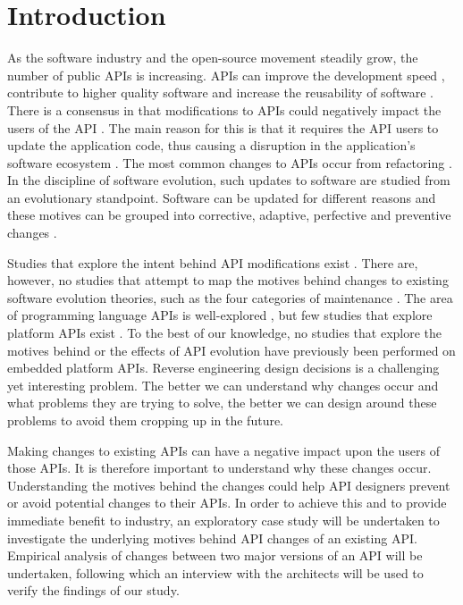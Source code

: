 \documentclass{sig-alternate}
\begin{document}
\section{Introduction} \label{introduction}
As the software industry and the open-source movement steadily grow, the number of public APIs is increasing. APIs can improve the development speed \cite{stylos2006comparing}, contribute to higher quality software \cite{stylos2006comparing} and increase the reusability of software \cite{afonso2012evaluating}. There is a consensus in that modifications to APIs could negatively impact the users of the API \cite{google_talk} \cite{mcdonnell2013empirical} \cite{robbes2012developers} \cite{henning2007api}. The main reason for this is that it requires the API users to update the application code, thus causing a disruption in the application's software ecosystem \cite{messerschmitt2005software}. The most common changes to APIs occur from refactoring \cite{dig2005role} \cite{xing2006refactoring}. 
In the discipline of software evolution, such updates to software are studied from an evolutionary standpoint. Software can be updated for different reasons and these motives can be grouped into corrective, adaptive, perfective and preventive changes \cite{lientz1980software}. 

Studies that explore the intent behind API modifications exist \cite{hou2011exploring}. There are, however, no studies that attempt to map the motives behind changes to existing software evolution theories, such as the four categories of maintenance \cite{lientz1980software}. The area of programming language APIs is well-explored \cite{hou2011exploring} \cite{shi2011empirical}, but few studies that explore platform APIs exist \cite{robbes2012developers}. To the best of our knowledge, no studies that explore the motives behind or the effects of API evolution have previously been performed on embedded platform APIs. Reverse engineering design decisions is a challenging yet interesting problem. The better we can understand why changes occur and what problems they are trying to solve, the better we can design around these problems to avoid them cropping up in the future.


Making changes to existing APIs can have a negative impact upon the users of those APIs. It is therefore important to understand why these changes occur. Understanding the motives behind the changes could help API designers prevent or avoid potential changes to their APIs. In order to achieve this and to provide immediate benefit to industry, an exploratory case study will be undertaken to investigate the underlying motives behind API changes of an existing API. Empirical analysis of changes between two major versions of an API will be undertaken, following which an interview with the architects will be used to verify the findings of our study. 
\end{document}
